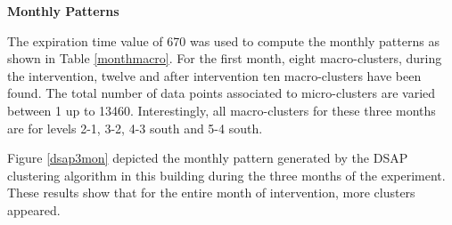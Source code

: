 
\textbf{Monthly Patterns}

The expiration time value of 670 was used to compute the monthly patterns as shown in Table \ref{monthmacro}. For the first month, eight macro-clusters, during the intervention, twelve and after intervention ten macro-clusters have been found. The total number of data points associated to micro-clusters are varied between 1 up to 13460. Interestingly, all macro-clusters for these three months are for levels 2-1, 3-2, 4-3 south and 5-4 south.  


Figure \ref{dsap3mon} depicted the monthly pattern generated by the DSAP clustering algorithm in this building during the three months of the experiment. These results show that for the entire month of intervention, more clusters appeared. 







